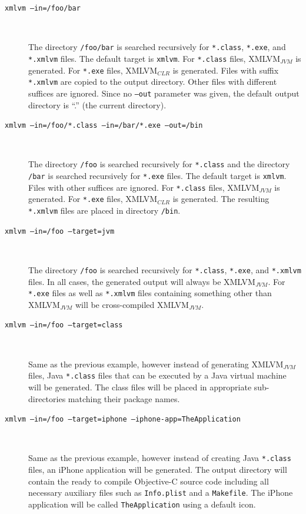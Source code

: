 \documentclass[11pt]{book}
\begin{document}
\begin{description}

\item[\texttt{xmlvm --in=/foo/bar}] $ $

  The directory \texttt{/foo/bar} is searched recursively for
  \texttt{*.class}, \texttt{*.exe}, and \texttt{*.xmlvm} files. The
  default target is \texttt{xmlvm}. For \texttt{*.class} files,
  XMLVM$_{JVM}$ is generated. For \texttt{*.exe} files, XMLVM$_{CLR}$
  is generated. Files with suffix \texttt{*.xmlvm} are copied to the
  output directory. Other files with different suffices are ignored.
  Since no \texttt{--out} parameter was given, the default output
  directory is ``.'' (the current directory).

\item[\texttt{xmlvm --in=/foo/*.class --in=/bar/*.exe --out=/bin}] $ $

  The directory \texttt{/foo} is searched recursively for
  \texttt{*.class} and the directory \texttt{/bar} is searched
  recursively for \texttt{*.exe} files. The default target is
  \texttt{xmlvm}. Files with other suffices are ignored. For
  \texttt{*.class} files, XMLVM$_{JVM}$ is generated. For
  \texttt{*.exe} files, XMLVM$_{CLR}$ is generated. The resulting
  \texttt{*.xmlvm} files are placed in directory \texttt{/bin}.

\item[\texttt{xmlvm --in=/foo --target=jvm}] $ $

  The directory \texttt{/foo} is searched recursively for
  \texttt{*.class}, \texttt{*.exe}, and \texttt{*.xmlvm} files. In all
  cases, the generated output will always be XMLVM$_{JVM}$. For
  \texttt{*.exe} files as well as \texttt{*.xmlvm} files containing
  something other than XMLVM$_{JVM}$ will be cross-compiled
  XMLVM$_{JVM}$.

\item[\texttt{xmlvm --in=/foo --target=class}] $ $

  Same as the previous example, however instead of generating
  XMLVM$_{JVM}$ files, Java \texttt{*.class} files that can be
  executed by a Java virtual machine will be generated. The class
  files will be placed in appropriate sub-directories matching their
  package names.

\item[\texttt{xmlvm --in=/foo --target=iphone --iphone-app=TheApplication}] $ $

  Same as the previous example, however instead of creating Java
  \texttt{*.class} files, an iPhone application will be generated.
  The output directory will contain the ready to compile Objective-C
  source code including all necessary auxiliary files such as
  \texttt{Info.plist} and a \texttt{Makefile}. The iPhone application
  will be called \texttt{TheApplication} using a default icon.


\end{description}
\end{document}
